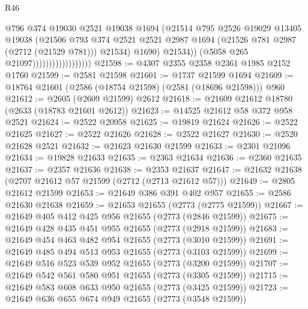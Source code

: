 \begin{lexlean}{R46}
\begin{coremodule}
                                          @796
                                          @374
                                          @19030
                                          @2521
                                          @19038
                                          @1694
                                          (@21514
                                            @795
                                            @2526
                                            @19029
                                            @13405
                                            @19038
                                            (@21506
                                              @793
                                              @374
                                              @2521
                                              @2521
                                              @2987
                                              @1694
                                              (@21526 @781 @2987 (@2712 (@21529 @781)))
                                              @21534)
                                            @1690)
                                          @21534))
                                      (@5058 @265 @21097))))))))))))))))))
@21598 := @4307 @2355 @2358 @2361 @1985 @2152 @1760
@21599 := @2581 @21598
@21601 := @1737 @21599 @1694
@21609 := @18764 @21601 (@2586 (@18754 @21598) (@2581 (@18696 @21598))) @960
@21612 := @2605 (@2609 @21599) @2612
@21618 := @21609 @21612 @18780 (@2633 (@18783 @21601 @2612))
@21623 := @14525 @21612 @58 @372 @958 @2521
@21624 := @2522 @20958
@21625 := @19819 @21624
@21626 := @2522 @21625
@21627 := @2522 @21626
@21628 := @2522 @21627
@21630 := @2520 @21628 @2521
@21632 := @21623 @21630 @21599
@21633 := @2301 @21096
@21634 := @19828 @21633
@21635 := @2363 @21634
@21636 := @2360 @21635
@21637 := @2357 @21636
@21638 := @2353 @21637
@21647 := @21632 @21638 (@2707 @21612 @57 @21599 (@2712 (@2713 @21612 @57)))
@21649 := @2805 @21612 @21599
@21653 := @21649 @386 @391 @402 @957
@21655 := @2586 @21630 @21638
@21659 := @21653 @21655 (@2773 (@2775 @21599))
@21667 := @21649 @405 @412 @425 @956 @21655 (@2773 (@2846 @21599))
@21675 := @21649 @428 @435 @451 @955 @21655 (@2773 (@2918 @21599))
@21683 := @21649 @454 @463 @482 @954 @21655 (@2773 (@3010 @21599))
@21691 := @21649 @485 @494 @513 @953 @21655 (@2773 (@3103 @21599))
@21699 := @21649 @516 @523 @539 @952 @21655 (@2773 (@3200 @21599))
@21707 := @21649 @542 @561 @580 @951 @21655 (@2773 (@3305 @21599))
@21715 := @21649 @583 @608 @633 @950 @21655 (@2773 (@3425 @21599))
@21723 := @21649 @636 @655 @674 @949 @21655 (@2773 (@3548 @21599))

\end{coremodule}
\end{lexlean}
